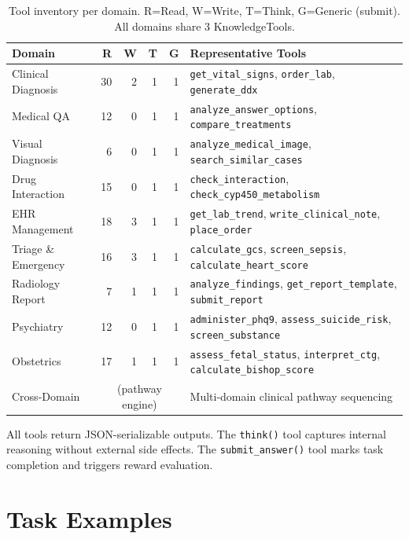 \documentclass{article}
\begin{document}
\begin{table}[h]
\centering
\caption{Tool inventory per domain. R=Read, W=Write, T=Think, G=Generic (submit). All domains share 3 KnowledgeTools.}
\label{tab:tool_inventory}
\small
\begin{tabular}{lrrrrl}
\toprule
\textbf{Domain} & \textbf{R} & \textbf{W} & \textbf{T} & \textbf{G} & \textbf{Representative Tools} \\
\midrule
Clinical Diagnosis & 30 & 2 & 1 & 1 & \texttt{get\_vital\_signs}, \texttt{order\_lab}, \texttt{generate\_ddx} \\
Medical QA & 12 & 0 & 1 & 1 & \texttt{analyze\_answer\_options}, \texttt{compare\_treatments} \\
Visual Diagnosis & 6 & 0 & 1 & 1 & \texttt{analyze\_medical\_image}, \texttt{search\_similar\_cases} \\
Drug Interaction & 15 & 0 & 1 & 1 & \texttt{check\_interaction}, \texttt{check\_cyp450\_metabolism} \\
EHR Management & 18 & 3 & 1 & 1 & \texttt{get\_lab\_trend}, \texttt{write\_clinical\_note}, \texttt{place\_order} \\
Triage \& Emergency & 16 & 3 & 1 & 1 & \texttt{calculate\_gcs}, \texttt{screen\_sepsis}, \texttt{calculate\_heart\_score} \\
Radiology Report & 7 & 1 & 1 & 1 & \texttt{analyze\_findings}, \texttt{get\_report\_template}, \texttt{submit\_report} \\
Psychiatry & 12 & 0 & 1 & 1 & \texttt{administer\_phq9}, \texttt{assess\_suicide\_risk}, \texttt{screen\_substance} \\
Obstetrics & 17 & 1 & 1 & 1 & \texttt{assess\_fetal\_status}, \texttt{interpret\_ctg}, \texttt{calculate\_bishop\_score} \\
Cross-Domain & \multicolumn{4}{c}{(pathway engine)} & Multi-domain clinical pathway sequencing \\
\bottomrule
\end{tabular}
\end{table}

All tools return JSON-serializable outputs. The \texttt{think()} tool captures internal reasoning without external side effects. The \texttt{submit\_answer()} tool marks task completion and triggers reward evaluation.


\section{Task Examples}
\label{app:tasks}
\end{document}
